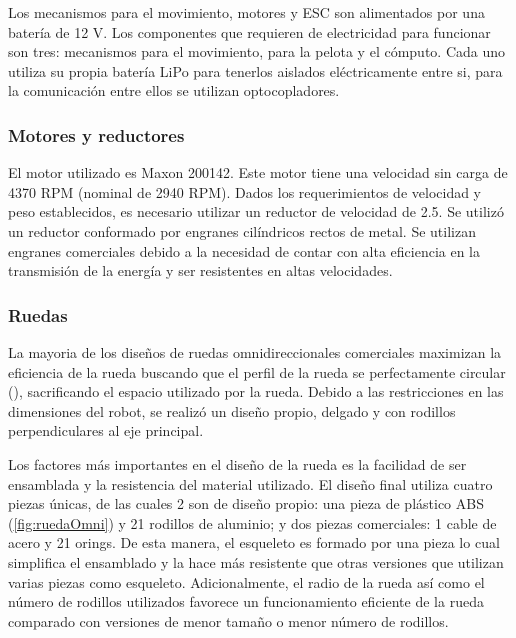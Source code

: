 \documentclass[twocolumn,10pt]{amrob}
\begin{document}
Los mecanismos para el movimiento, motores y ESC son alimentados por una batería de 12 V. Los componentes que requieren de electricidad para funcionar son tres: mecanismos para el movimiento, para la pelota y el cómputo. Cada uno utiliza su propia batería LiPo para tenerlos aislados eléctricamente entre si, para la comunicación entre ellos se utilizan optocopladores. 


\subsubsection*{Motores y reductores}
El motor utilizado es Maxon 200142. Este motor tiene una velocidad sin carga de 4370 RPM (nominal de 2940 RPM). Dados los requerimientos de velocidad y peso establecidos, es necesario utilizar un reductor de velocidad de 2.5. Se utilizó un reductor conformado por engranes cilíndricos rectos de metal. Se utilizan engranes comerciales debido a la necesidad de contar con alta eficiencia en la transmisión de la energía y ser resistentes en altas velocidades.


\subsubsection*{Ruedas}
La mayoria de los diseños de ruedas omnidireccionales comerciales maximizan la eficiencia de la rueda buscando que el perfil de la rueda se perfectamente circular (\cite{rojas2005short}), sacrificando el espacio utilizado por la rueda. Debido a las restricciones en las dimensiones del robot, se realizó un diseño propio, delgado y con rodillos perpendiculares al eje principal.

Los factores más importantes en el diseño de la rueda es la facilidad de ser ensamblada y la resistencia del material utilizado. El diseño final utiliza cuatro piezas únicas, de las cuales 2 son de diseño propio: una pieza de plástico ABS (\ref{fig:ruedaOmni}) y 21 rodillos de aluminio; y dos piezas comerciales: 1 cable de acero y 21 orings. De esta manera, el esqueleto es formado por una pieza lo cual simplifica el ensamblado y la hace más resistente que otras versiones que utilizan varias piezas como esqueleto. Adicionalmente, el radio de la rueda así como el número de rodillos utilizados favorece un funcionamiento eficiente de la rueda comparado con versiones de menor tamaño o menor número de rodillos.
\end{document}
